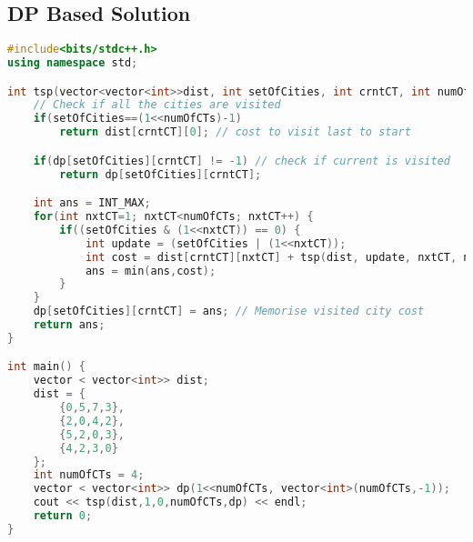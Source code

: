 \newpage
\subsection{DP Based Solution}

\begin{lstlisting}[language=C++]
#include<bits/stdc++.h>
using namespace std;

int tsp(vector<vector<int>>dist, int setOfCities, int crntCT, int numOfCTs, vector<vector<int>>dp) {
    // Check if all the cities are visited
    if(setOfCities==(1<<numOfCTs)-1) 
        return dist[crntCT][0]; // cost to visit last to start

    if(dp[setOfCities][crntCT] != -1) // check if current is visited
        return dp[setOfCities][crntCT];

    int ans = INT_MAX;
    for(int nxtCT=1; nxtCT<numOfCTs; nxtCT++) {
        if((setOfCities & (1<<nxtCT)) == 0) {  
            int update = (setOfCities | (1<<nxtCT));
            int cost = dist[crntCT][nxtCT] + tsp(dist, update, nxtCT, numOfCTs,dp);
            ans = min(ans,cost);
        }
    }
    dp[setOfCities][crntCT] = ans; // Memorise visited city cost
    return ans;
}

int main() {
    vector < vector<int>> dist;
    dist = {
        {0,5,7,3},
        {2,0,4,2},
        {5,2,0,3},
        {4,2,3,0}
    };
    int numOfCTs = 4;
    vector < vector<int>> dp(1<<numOfCTs, vector<int>(numOfCTs,-1));
    cout << tsp(dist,1,0,numOfCTs,dp) << endl;
    return 0;
}
\end{lstlisting}
		

